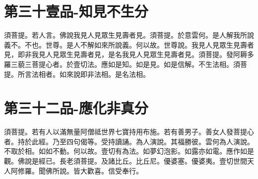 \documentclass[a6paper, 22pt, twocolumn]{cvertbook}
\begin{document}
\chapter{第三十壹品-知見不生分}
須菩提。若人言。佛說我見人見眾生見壽者見。須菩提。於意雲何。是人解我所說義不。不也。世尊。是人不解如來所說義。何以故。世尊說。我見人見眾生見壽者見，即非我見人見眾生見壽者見，是名我見人見眾生見壽者見。須菩提。發阿耨多羅三藐三菩提心者。於壹切法。應如是知。如是見。如是信解。不生法相。須菩提。所言法相者。如來說即非法相。是名法相。
\chapter{第三十二品-應化非真分}
須菩提。若有人以滿無量阿僧祗世界七寶持用布施。若有善男子。善女人發菩提心者。持於此經。乃至四句偈等。受持讀誦。為人演說。其福勝彼。雲何為人演說。不取於相。如如不動。何以故。壹切有為法。如夢幻泡影。如露亦如電。應作如是觀。佛說是經已。長老須菩提。及諸比丘。比丘尼。優婆塞。優婆夷。壹切世間天人阿修羅。聞佛所說。皆大歡喜。信受奉行。
\end{document}
